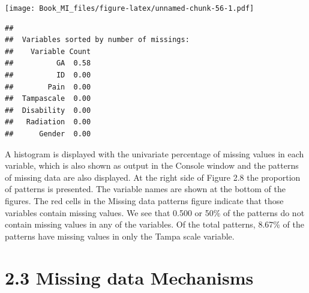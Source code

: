 \documentclass[]{book}
\theoremstyle{definition}
\theoremstyle{definition}
\theoremstyle{definition}
\theoremstyle{remark}
\begin{document}
\texttt{[image: Book\_MI\_files/figure-latex/unnamed-chunk-56-1.pdf]}

\begin{verbatim}
## 
##  Variables sorted by number of missings: 
##    Variable Count
##          GA  0.58
##          ID  0.00
##        Pain  0.00
##  Tampascale  0.00
##  Disability  0.00
##   Radiation  0.00
##      Gender  0.00
\end{verbatim}

A histogram is displayed with the univariate percentage of missing
values in each variable, which is also shown as output in the Console
window and the patterns of missing data are also displayed. At the right
side of Figure 2.8 the proportion of patterns is presented. The variable
names are shown at the bottom of the figures. The red cells in the
Missing data patterns figure indicate that those variables contain
missing values. We see that 0.500 or 50\% of the patterns do not contain
missing values in any of the variables. Of the total patterns, 8.67\% of
the patterns have missing values in only the Tampa scale variable.

\section{2.3 Missing data Mechanisms}\label{missing-data-mechanisms}
\end{document}
